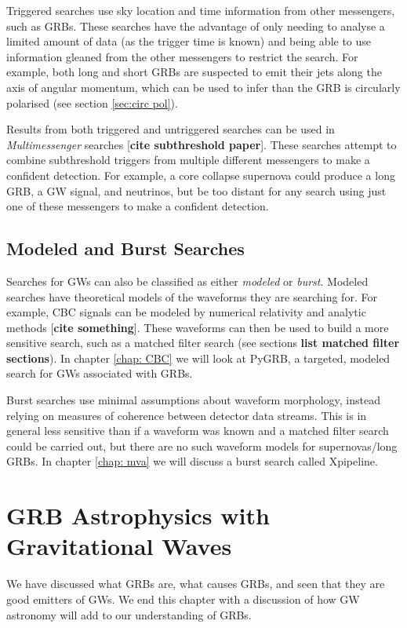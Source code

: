 \documentclass[11pt]{cuthesis}
\begin{document}
Triggered searches use sky location and time information from other messengers, such as GRBs. These searches have the advantage of only needing to analyse a limited amount of data (as the trigger time is known) and being able to use information gleaned from the other messengers to restrict the search. For example, both long and short GRBs are suspected to emit their jets along the axis of angular momentum, which can be used to infer than the GRB is circularly polarised (see section \ref{sec:circ pol}). 

Results from both triggered and untriggered searches can be used in \textit{Multimessenger} searches [\textbf{cite subthreshold paper}]. These searches attempt to combine subthreshold triggers from multiple different messengers to make a confident detection. For example, a core collapse supernova could produce a long GRB, a GW signal, and neutrinos, but be too distant for any search using just one of these messengers to make a confident detection. 

\subsection{Modeled and Burst Searches}
Searches for GWs can also be classified as either \textit{modeled} or \textit{burst}. Modeled searches have theoretical models of the waveforms they are searching for. For example, CBC signals can be modeled by numerical relativity and analytic methods [\textbf{cite something}]. These waveforms can then be used to build a more sensitive search, such as a matched filter search (see sections \textbf{list matched filter sections}). In chapter \ref{chap: CBC} we will look at PyGRB, a targeted, modeled search for GWs associated with GRBs. 

Burst searches use minimal assumptions about waveform morphology, instead relying on measures of coherence between detector data streams. This is in general less sensitive than if a waveform was known and a matched filter search could be carried out, but there are no such waveform models for supernovas/long GRBs. In chapter \ref{chap: mva} we will discuss a burst search called Xpipeline. 

\section{GRB Astrophysics with Gravitational Waves}
We have discussed what GRBs are, what causes GRBs, and seen that they are good emitters of GWs. We end this chapter with a discussion of how GW astronomy will add to our understanding of GRBs. 
\end{document}
